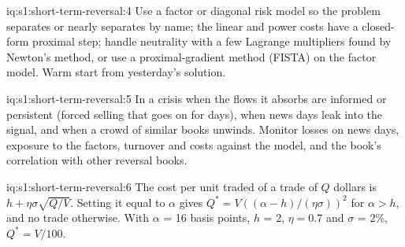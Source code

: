 \begin{solution}{iq:s1:short-term-reversal:4}
Use a factor or diagonal risk model so the problem separates or nearly separates by name; the linear and power costs have a closed-form proximal step; handle
neutrality with a few Lagrange multipliers found by Newton's method, or use a proximal-gradient method (FISTA) on the factor model. Warm start from yesterday's
solution.
\end{solution}

\begin{solution}{iq:s1:short-term-reversal:5}
In a crisis when the flows it absorbs are informed or persistent (forced selling that goes on for days), when news days leak into the signal, and when a crowd
of similar books unwinds. Monitor losses on news days, exposure to the factors, turnover and costs against the model, and the book's correlation with other
reversal books.
\end{solution}

\begin{solution}{iq:s1:short-term-reversal:6}
The cost per unit traded of a trade of $Q$ dollars is $h + \eta\sigma\sqrt{Q/V}$. Setting it equal to $\alpha$ gives $Q^* = V\left((\alpha - h)/(\eta\sigma)\right)^2$
for $\alpha > h$, and no trade otherwise. With $\alpha$ = 16 basis points, $h$ = 2, $\eta = 0.7$ and $\sigma$ = 2\%, $Q^* = V/100$.
\end{solution}
